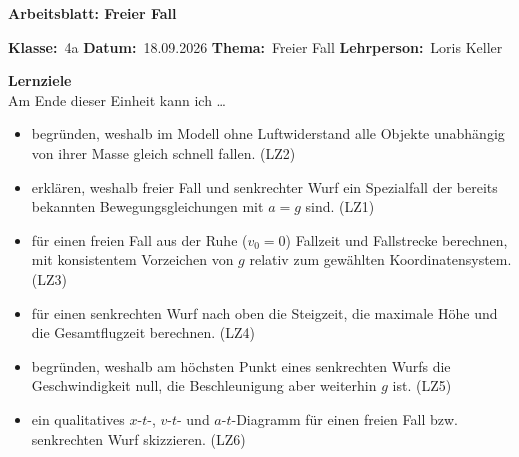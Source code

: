\documentclass[addpoints,11pt,a4paper]{exam}
\newcommand{\Kopfzeile}[4]{%
  \begin{titlebox}
    {\color{white}\sffamily\bfseries\Large #4}
  \end{titlebox}
  \vspace{0.5em}
  \noindent\textbf{Klasse:}~#1 \hfill \textbf{Datum:}~#2 \hfill \textbf{Thema:}~#3
    \hfill \textbf{Lehrperson:}~Loris Keller
  \vspace{0.8em}
  \lhead{\textcolor{darkgray}{#3}}
  \rhead{\textcolor{darkgray}{#4}}
}
\newcommand{\Klasse}{4a}
\newcommand{\Datum}{18.09.2026}
\newcommand{\Thema}{Freier Fall}
\newcommand{\ArbeitsblattTitel}{Arbeitsblatt: Freier Fall}
\begin{document}
\Kopfzeile{\Klasse}{\Datum}{\Thema}{\ArbeitsblattTitel}

\begin{infobox}
\textbf{Lernziele}\\
Am Ende dieser Einheit kann ich \dots
\begin{itemize}[leftmargin=1.2cm,itemsep=0.25em]
  \item begründen, weshalb im Modell ohne Luftwiderstand alle Objekte unabhängig von ihrer Masse gleich schnell fallen. (LZ2)
  \item erklären, weshalb freier Fall und senkrechter Wurf ein Spezialfall der bereits bekannten Bewegungsgleichungen mit $a=g$ sind. (LZ1)
  \item für einen freien Fall aus der Ruhe ($v_0=0$) Fallzeit und Fallstrecke berechnen, mit konsistentem Vorzeichen von $g$ relativ zum gewählten Koordinatensystem. (LZ3)
  \item für einen senkrechten Wurf nach oben die Steigzeit, die maximale Höhe und die Gesamtflugzeit berechnen. (LZ4)
  \item begründen, weshalb am höchsten Punkt eines senkrechten Wurfs die Geschwindigkeit null, die Beschleunigung aber weiterhin $g$ ist. (LZ5)
  \item ein qualitatives $x$-$t$-, $v$-$t$- und $a$-$t$-Diagramm für einen freien Fall bzw. senkrechten Wurf skizzieren. (LZ6)
\end{itemize}
\end{infobox}
\end{document}

